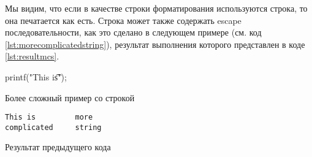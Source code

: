 \documentclass[12pt]{article}
\begin{document}
Мы видим, что если в качестве строки форматирования используются строка, то она печатается как есть. Строка может также содержать escape последовательности, как это сделано в следующем примере (см. код \ref{lst:morecomplicatedstring}), результат выполнения которого представлен в коде \ref{lst:resultmcs}.

\begin{listing}[H]
\begin{center}
\begin{ccode}
printf("This is\t\tmore\ncomplicated\tstring\n");
\end{ccode}
\end{center}
\caption{Более сложный пример со строкой}
\label{lst:morecomplicatedstring}
\end{listing}

\begin{listing}[H]
\begin{center}
\begin{verbatim}
This is         more
complicated     string

\end{verbatim}
\end{center}
\caption{Результат предыдущего кода}
\label{lst:resultmcs}
\end{listing}
\end{document}

